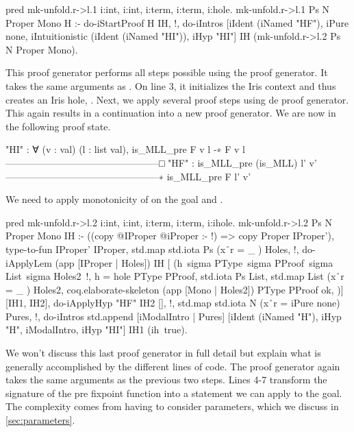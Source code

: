 \documentclass[thesis.tex]{subfiles}
\begin{document}
\begin{elpicode}
  pred mk-unfold.r->l.1 i:int, i:int, 
                        i:term, i:term, i:hole.
  mk-unfold.r->l.1 Ps N Proper Mono H :-
    do-iStartProof H IH, !,
    do-iIntros [iIdent (iNamed "HF"), iPure none, 
                iIntuitionistic (iIdent (iNamed "HI")), 
                iHyp "HI"] IH 
               (mk-unfold.r->l.2 Ps N Proper Mono).
\end{elpicode}
This proof generator performs all steps possible using the  proof generator. It takes the same arguments as . On line 3, it initializes the Iris context and thus creates an Iris hole, . Next, we apply several proof steps using de  proof generator. This again results in a continuation into a new proof generator. We are now in the following proof state.
\begin{coqcode}
  "HI" : ∀ (v : val) (l : list val), 
          is_MLL_pre F v l -∗ F v l
  ------------------------------------------------□
  "HF" : is_MLL_pre (is_MLL) l' v'
  ------------------------------------------------∗
  is_MLL_pre F l' v'
\end{coqcode}
We need to apply monotonicity of  on the goal and .
\begin{elpicode}
  pred mk-unfold.r->l.2 i:int, i:int, 
                           i:term, i:term, i:ihole.
  mk-unfold.r->l.2 Ps N Proper Mono IH :-
    ((copy {{ @IProper }} {{ @iProper }} :- !) => 
      copy Proper IProper'),
    type-to-fun IProper' IProper,
    std.map {std.iota Ps} (x\r\ r = {{ _ }}) Holes, !,
    do-iApplyLem (app [IProper | Holes]) IH [
      (h\ sigma PType\ sigma PProof\ 
          sigma List\ sigma Holes2\ !,
        h = hole PType PProof,
        std.iota Ps List,
        std.map List (x\r\ r = {{ _ }}) Holes2,
        coq.elaborate-skeleton (app [Mono | Holes2]) 
                               PType PProof ok,
    )] [IH1, IH2],
    do-iApplyHyp "HF" IH2 [], !,
    std.map {std.iota N} (x\r\ r = iPure none) Pures, !,
    do-iIntros 
      {std.append [iModalIntro | Pures] 
                  [iIdent (iNamed "H"), iHyp "H", 
                   iModalIntro, iHyp "HI"]} 
      IH1 (ih\ true).
\end{elpicode}
We won't discuss this last proof generator in full detail but explain what is generally accomplished by the different lines of code. The proof generator again takes the same arguments as the previous two steps.
Lines 4-7 transform the signature of the pre fixpoint function into a statement we can apply to the goal. The complexity comes from having to consider parameters, which we discuss in \cref{sec:parameters}.
\end{document}
